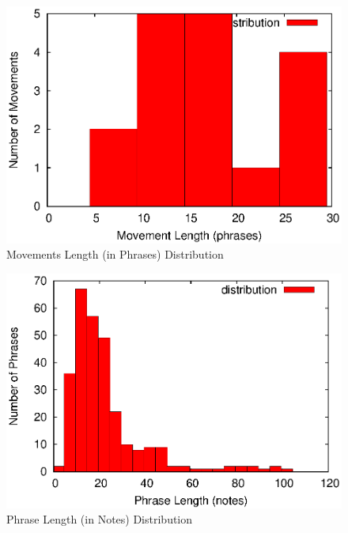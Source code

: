 \begin{figure}[tp]
   \begin{center}
      \includegraphics[width=\textwidth]{fig/phrases}

   \end{center}
   \caption{Movements Length (in Phrases) Distribution}
   \label{fig:phrases}
\end{figure}
\begin{figure}[tp]
   \begin{center}
      \includegraphics[width=\textwidth]{fig/phrlength}

   \end{center}
   \caption{Phrase Length (in Notes) Distribution}
   \label{fig:phrlength}
\end{figure}


